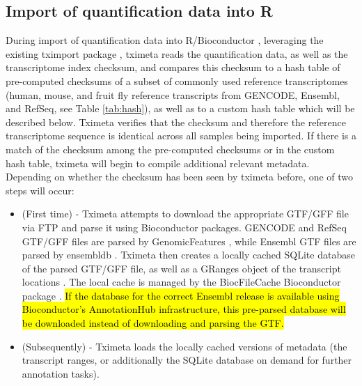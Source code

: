 \subsection*{Import of quantification data into R}

During import of quantification data into R/Bioconductor
\cite{bioc}, leveraging the existing tximport package
\cite{tximport}, tximeta reads the quantification data, as well as
the transcriptome index checksum, and compares this checksum to a hash
table of pre-computed checksums of a subset of commonly used reference
transcriptomes (human, mouse, and fruit fly reference transcripts from
GENCODE, Ensembl, and RefSeq, see Table \ref{tab:hash}), as well as to a
custom hash table which will be described below. Tximeta verifies that
the checksum and therefore the reference transcriptome sequence is
identical across all samples being imported. If there is a match of
the checksum among the pre-computed checksums or in the custom hash table,
tximeta will begin to compile additional relevant
metadata. Depending on whether the checksum has been seen by tximeta
before, one of two steps will occur:

\begin{itemize}
\item (First time) - Tximeta attempts to download the appropriate GTF/GFF
  file via FTP and parse it using Bioconductor packages. 
  GENCODE and RefSeq GTF/GFF files are parsed
  by GenomicFeatures \cite{granges}, while Ensembl GTF files are
  parsed by ensembldb \cite{ensembldb}. Tximeta then creates a
  locally cached SQLite database of the parsed GTF/GFF file, as well as a
  GRanges object of the transcript locations \cite{granges}. The
  local cache is managed by the BiocFileCache Bioconductor package
  \cite{biocfilecache}. \hl{If the database for the correct Ensembl
    release is available using Bioconductor's AnnotationHub
    infrastructure, this pre-parsed database will be downloaded
    instead of downloading and parsing the GTF.}
\item (Subsequently) - Tximeta loads the locally cached versions of
  metadata (the transcript ranges, or additionally the SQLite database
  on demand for further annotation tasks).
\end{itemize}

